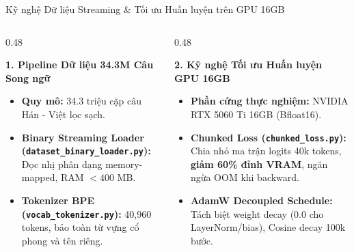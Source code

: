 \documentclass[aspectratio=169, 10pt]{beamer}
\begin{document}
\begin{frame}{Kỹ nghệ Dữ liệu Streaming \& Tối ưu Huấn luyện trên GPU 16GB}
  \begin{columns}[t]
    \begin{column}{0.48\textwidth}
      \begin{block}{\textbf{1. Pipeline Dữ liệu 34.3M Câu Song ngữ}}
        \footnotesize
        \begin{itemize}
          \item \textbf{Quy mô:} 34.3 triệu cặp câu Hán - Việt lọc sạch.
          \item \textbf{Binary Streaming Loader (\texttt{dataset\_binary\_loader.py}):} Đọc nhị phân dạng memory-mapped, RAM $< 400\text{ MB}$.
          \item \textbf{Tokenizer BPE (\texttt{vocab\_tokenizer.py}):} 40,960 tokens, bảo toàn từ vựng cổ phong và tên riêng.
        \end{itemize}
      \end{block}
    \end{column}
    \begin{column}{0.48\textwidth}
      \begin{block}{\textbf{2. Kỹ nghệ Tối ưu Huấn luyện GPU 16GB}}
        \footnotesize
        \begin{itemize}
          \item \textbf{Phần cứng thực nghiệm:} NVIDIA RTX 5060 Ti 16GB (Bfloat16).
          \item \textbf{Chunked Loss (\texttt{chunked\_loss.py}):} Chia nhỏ ma trận logits 40k tokens, \textbf{giảm 60\% đỉnh VRAM}, ngăn ngừa OOM khi backward.
          \item \textbf{AdamW Decoupled Schedule:} Tách biệt weight decay (0.0 cho LayerNorm/bias), Cosine decay 100k bước.
        \end{itemize}
      \end{block}
    \end{column}
  \end{columns}
\end{frame}
\end{document}
